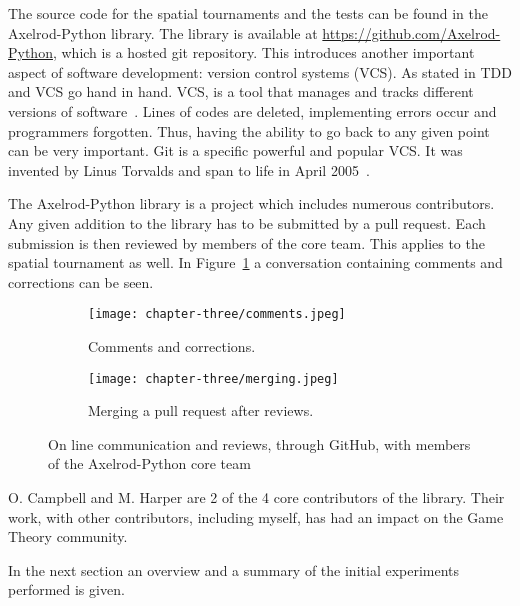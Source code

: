 The source code for the spatial tournaments and the tests can be found
in the Axelrod-Python library. The library is available at
\url{https://github.com/Axelrod-Python},
which is a hosted git repository. This introduces another important aspect
of software development: version control systems (VCS). As stated in \cite{Developer}
TDD and VCS go hand in hand. VCS, is a tool that manages and tracks different
versions of software~\cite{Vogel2014}. Lines of codes are deleted, implementing
errors occur and programmers forgotten. Thus, having the ability to go back to any
given point can be very important. Git is a specific powerful and popular VCS. It
was invented by Linus Torvalds and span to life in April 2005~\cite{Vogel2014}.

The Axelrod-Python library is a project which includes numerous contributors.
Any given addition to the
library has to be submitted by a pull request. Each submission is then
reviewed by members of the core team. This applies to the spatial tournament as well.
In Figure~\ref{fig:github} a conversation containing comments and corrections
can be seen.

\begin{figure}[H]
	\centering
	\begin{subfigure}[H]{1\textwidth}
		\centering
		\texttt{[image: chapter-three/comments.jpeg]}
		\caption{Comments and corrections.}
	\end{subfigure}
	\hfill
	\begin{subfigure}[H]{1\textwidth}
		\centering
		\texttt{[image: chapter-three/merging.jpeg]}
		\caption{Merging a pull request after reviews.}
	\end{subfigure}
	\caption{On line communication and reviews, through GitHub,
	with members of the Axelrod-Python core team}
	\label{fig:github}
\end{figure}

O. Campbell and M. Harper are 2 of the 4 core contributors of the library.
Their work, with other contributors, including myself, has had an impact on
the Game Theory community.

In the next section an overview and a summary of the initial experiments
performed is given.

